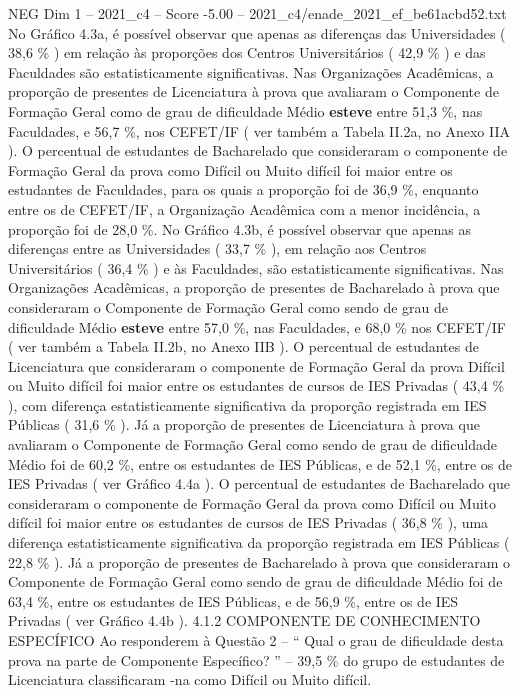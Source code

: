 \begin{textsample}{NEG Dim 1 – 2021\_c4 – Score -5.00 – 2021\_c4/enade\_2021\_ef\_be61acbd52.txt}
No Gráfico 4.3a, é possível observar que apenas as diferenças das Universidades ( 38,6 \% ) em relação às proporções dos Centros Universitários ( 42,9 \% ) e das Faculdades são estatisticamente significativas.
Nas Organizações Acadêmicas, a proporção de presentes de Licenciatura à prova que avaliaram o Componente de Formação Geral como de grau de dificuldade Médio \textbf{esteve} entre 51,3 \%, nas Faculdades, e 56,7 \%, nos CEFET/IF ( ver também a Tabela II.2a, no Anexo IIA ).
O percentual de estudantes de Bacharelado que consideraram o componente de Formação Geral da prova como Difícil ou Muito difícil foi maior entre os estudantes de Faculdades, para os quais a proporção foi de 36,9 \%, enquanto entre os de CEFET/IF, a Organização Acadêmica com a menor incidência, a proporção foi de 28,0 \%.
No Gráfico 4.3b, é possível observar que apenas as diferenças entre as Universidades ( 33,7 \% ), em relação aos Centros Universitários ( 36,4 \% ) e às Faculdades, são estatisticamente significativas.
Nas Organizações Acadêmicas, a proporção de presentes de Bacharelado à prova que consideraram o Componente de Formação Geral como sendo de grau de dificuldade Médio \textbf{esteve} entre 57,0 \%, nas Faculdades, e 68,0 \% nos CEFET/IF ( ver também a Tabela II.2b, no Anexo IIB ).
O percentual de estudantes de Licenciatura que consideraram o componente de Formação Geral da prova Difícil ou Muito difícil foi maior entre os estudantes de cursos de IES Privadas ( 43,4 \% ), com diferença estatisticamente significativa da proporção registrada em IES Públicas ( 31,6 \% ).
Já a proporção de presentes de Licenciatura à prova que avaliaram o Componente de Formação Geral como sendo de grau de dificuldade Médio foi de 60,2 \%, entre os estudantes de IES Públicas, e de 52,1 \%, entre os de IES Privadas ( ver Gráfico 4.4a ).
O percentual de estudantes de Bacharelado que consideraram o componente de Formação Geral da prova como Difícil ou Muito difícil foi maior entre os estudantes de cursos de IES Privadas ( 36,8 \% ), uma diferença estatisticamente significativa da proporção registrada em IES Públicas ( 22,8 \% ).
Já a proporção de presentes de Bacharelado à prova que consideraram o Componente de Formação Geral como sendo de grau de dificuldade Médio foi de 63,4 \%, entre os estudantes de IES Públicas, e de 56,9 \%, entre os de IES Privadas ( ver Gráfico 4.4b ). 4.1.2 COMPONENTE DE CONHECIMENTO ESPECÍFICO Ao responderem à Questão 2 – “ Qual o grau de dificuldade desta prova na parte de Componente Específico? ” – 39,5 \% do grupo de estudantes de Licenciatura classificaram -na como Difícil ou Muito difícil.

\end{textsample}
